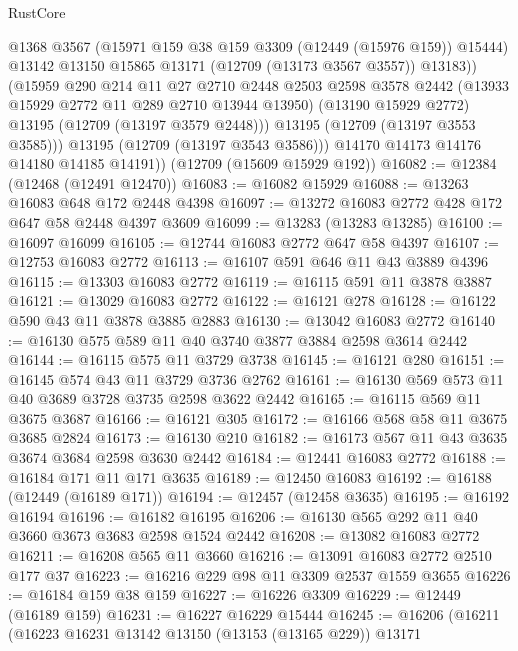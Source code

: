 \begin{lexlean}{RustCore}
\begin{coremodule}
                @1368
                @3567
                (@15971 @159 @38 @159 @3309 (@12449 (@15976 @159)) @15444)
                @13142
                @13150
                @15865
                @13171
                (@12709 (@13173 @3567 @3557))
                @13183))
            (@15959
              @290
              @214
              @11
              @27
              @2710
              @2448
              @2503
              @2598
              @3578
              @2442
              (@13933 @15929 @2772 @11 @289 @2710 @13944 @13950)
              (@13190 @15929 @2772)
              @13195
              (@12709 (@13197 @3579 @2448)))
            @13195
            (@12709 (@13197 @3553 @3585)))
          @13195
          (@12709 (@13197 @3543 @3586)))
        @14170
        @14173
        @14176
        @14180
        @14185
        @14191))
    (@12709 (@15609 @15929 @192))
@16082 := @12384 (@12468 (@12491 @12470))
@16083 := @16082 @15929
@16088 := @13263 @16083 @648 @172 @2448 @4398
@16097 := @13272 @16083 @2772 @428 @172 @647 @58 @2448 @4397 @3609
@16099 := @13283 (@13283 @13285)
@16100 := @16097 @16099
@16105 := @12744 @16083 @2772 @647 @58 @4397
@16107 := @12753 @16083 @2772
@16113 := @16107 @591 @646 @11 @43 @3889 @4396
@16115 := @13303 @16083 @2772
@16119 := @16115 @591 @11 @3878 @3887
@16121 := @13029 @16083 @2772
@16122 := @16121 @278
@16128 := @16122 @590 @43 @11 @3878 @3885 @2883
@16130 := @13042 @16083 @2772
@16140 := @16130 @575 @589 @11 @40 @3740 @3877 @3884 @2598 @3614 @2442
@16144 := @16115 @575 @11 @3729 @3738
@16145 := @16121 @280
@16151 := @16145 @574 @43 @11 @3729 @3736 @2762
@16161 := @16130 @569 @573 @11 @40 @3689 @3728 @3735 @2598 @3622 @2442
@16165 := @16115 @569 @11 @3675 @3687
@16166 := @16121 @305
@16172 := @16166 @568 @58 @11 @3675 @3685 @2824
@16173 := @16130 @210
@16182 := @16173 @567 @11 @43 @3635 @3674 @3684 @2598 @3630 @2442
@16184 := @12441 @16083 @2772
@16188 := @16184 @171 @11 @171 @3635
@16189 := @12450 @16083
@16192 := @16188 (@12449 (@16189 @171))
@16194 := @12457 (@12458 @3635)
@16195 := @16192 @16194
@16196 := @16182 @16195
@16206 := @16130 @565 @292 @11 @40 @3660 @3673 @3683 @2598 @1524 @2442
@16208 := @13082 @16083 @2772
@16211 := @16208 @565 @11 @3660
@16216 := @13091 @16083 @2772 @2510 @177 @37
@16223 := @16216 @229 @98 @11 @3309 @2537 @1559 @3655
@16226 := @16184 @159 @38 @159
@16227 := @16226 @3309
@16229 := @12449 (@16189 @159)
@16231 := @16227 @16229 @15444
@16245 := @16206
    (@16211
      (@16223
        @16231
        @13142
        @13150
        (@13153 (@13165 @229))
        @13171

\end{coremodule}
\end{lexlean}
